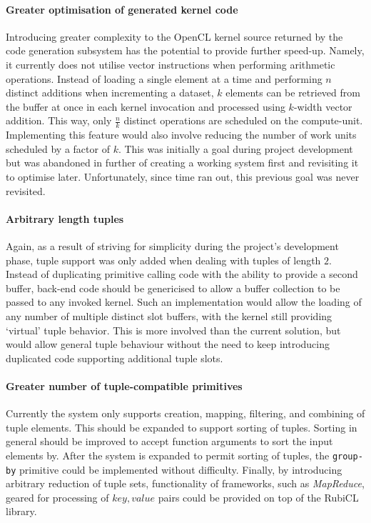 \paragraph*{Greater optimisation of generated kernel code} Introducing greater complexity to the \ac{OpenCL} kernel source returned by the code generation subsystem has the potential to provide further speed-up. Namely, it currently does not utilise vector instructions when performing arithmetic operations. Instead of loading a single element at a time and performing $n$ distinct additions when incrementing a dataset, $k$ elements can be retrieved from the buffer at once in each kernel invocation and processed using $k$-width vector addition. This way, only $\frac{n}{k}$ distinct operations are scheduled on the compute-unit. Implementing this feature would also involve reducing the number of work units scheduled by a factor of $k$.
This was initially a goal during project development but was abandoned in further of creating a working system first and revisiting it to optimise later. Unfortunately, since time ran out, this previous goal was never revisited.

\paragraph*{Arbitrary length tuples} Again, as a result of striving for simplicity during the project's development phase, tuple support was only added when dealing with tuples of length $2$. Instead of duplicating primitive calling code with the ability to provide a second buffer, back-end code should be genericised to allow a buffer collection to be passed to any invoked kernel.
Such an implementation would allow the loading of any number of multiple distinct slot buffers, with the kernel still providing `virtual' tuple behavior.
This is more involved than the current solution, but would allow general tuple behaviour without the need to keep introducing duplicated code supporting additional tuple slots.

\paragraph*{Greater number of tuple-compatible primitives} Currently the system only supports creation, mapping, filtering, and combining of tuple elements. This should be expanded to support sorting of tuples. Sorting in general should be improved to accept function arguments to sort the input elements by. After the system is expanded to permit sorting of tuples, the \verb|group-by| primitive could be implemented without difficulty. Finally, by introducing arbitrary reduction of tuple sets, functionality of frameworks, such as \emph{MapReduce}, geared for processing of $key, value$ pairs could be provided on top of the RubiCL library.

